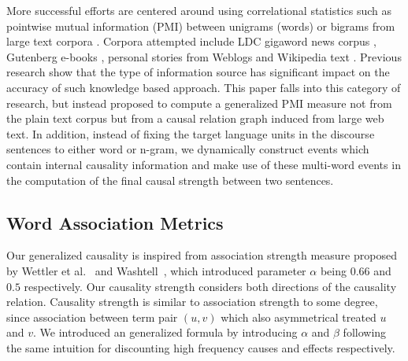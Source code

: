 More successful efforts are centered around using correlational
statistics \cite{gordon2012copa} such as pointwise mutual
information (PMI) between unigrams (words) or bigrams from large
text corpora \cite{Mihalcea2006:CKM}. Corpora attempted include LDC
gigaword news corpus \cite{goodwin2012utdhlt}, Gutenberg e-books
\cite{roemmele2011choice}, personal stories from Weblogs
\cite{gordon2011commonsense} and Wikipedia text
\cite{jabeen2014exploiting}. Previous research show that the type of
information source has significant impact on the accuracy of such
knowledge based approach. This paper falls into this category of
research, but instead proposed to compute a generalized PMI measure
\cite{Washtell09:CWW} not from the plain text corpus but from a
causal relation graph induced from large web text. In addition,
instead of fixing the target language units in the discourse
sentences to either word or n-gram, we dynamically construct events
which contain internal causality information and make use of these
multi-word events in the computation of the final causal strength
between two sentences.

\subsection{Word Association Metrics}
Our generalized causality is inspired from association strength measure 
proposed by Wettler et al.~\cite{Wettler:1993} and Washtell~\cite{Washtell09:CWW}, 
which introduced parameter $\alpha$ being $0.66$ and $0.5$ respectively.
Our causality strength considers both directions of the causality
relation. Causality strength is similar to
association strength to some degree, since association between term pair $(u,v)$ which also asymmetrical treated $u$ and $v$. We introduced an generalized
formula by introducing $\alpha$ and $\beta$ following the same intuition
for discounting high frequency causes and effects respectively.


